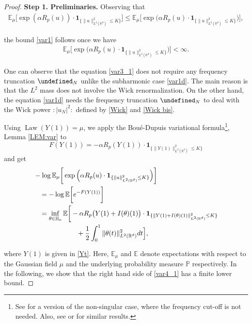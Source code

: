 \documentclass[%
11pt,  reqno]{amsart}
\theoremstyle{remarkstyle}
\newcommand{\1}{\hspace{0.2mm}\text{I}\hspace{0.2mm}}
\newcommand{\noi}{\noindent}
\newcommand{\R}{\mathbb{R}}
\let\P= \undefined
\newcommand{\P}{\mathbf{P}}
\newcommand{\E}{\mathbb{E}}
\newcommand{\al}{\alpha}
\newcommand{\ind}{\mathbf 1}
\newcommand{\PP}{\mathbb{P}}
\DeclareMathOperator{\Law}{Law}
\numberwithin{equation}{section}
\numberwithin{theorem}{section}
\begin{document}
	
	\begin{proof}
		
		\noindent\textbf{Step 1. Preliminaries.} Observing that
		\begin{align*}
			\E_{\mu}  \Big[ \exp (\al R_p(u)) \cdot  \ind_{\{\|u\|^2_{L^2(\R^d)}\le K\}}\Big]
			\le \E_{\mu}  \bigg[ \exp \Big(\al R_p(u) \cdot  \ind_{\{\|u\|^2_{L^2(\R^d)}\le K\}} \Big)\bigg],
		\end{align*}
		
		\noi
		the bound \eqref{var1} follows once we have
		\begin{align}\label{var3_1}
			\E_{\mu}  \bigg[ \exp \Big(\al R_p(u) \cdot  \ind_{\{\|u\|^2_{L^2(\R^d)}\le K\}} \Big)\bigg]  < \infty.
		\end{align}
		
		\medskip 
		One can observe that the equation \eqref{var3_1} does not require any frequency truncation $\P_N$ unlike the subharmonic case \eqref{var1d}. The main reason is that the $L^2$ mass does not involve the Wick renormalization. On the other hand, the equation \eqref{var1d} needs the frequency truncation $\P_N$ to deal with the Wick power $:|u_N|^2:$ defined by \eqref{Wick} and \eqref{Wick bis}.
		
		Using $\Law(Y(1))= \mu$, we apply the Bou\'e-Dupuis variational formula\footnote{See \cite[Theorem 3.2]{Zhang09} for a version of the non-singular case, where the frequency cut-off is not needed. Also, see \cite[Proposition A.1]{TW23} or \cite[Lemma 3.1]{LW22} for similar results.}, Lemma \ref{LEM:var} to 
		$$
		F(Y(1)) = - \al R_p(Y(1)) \cdot  \ind_{\{\|Y(1)\|^2_{L^2(\R^d)}\le K\}}
		$$ 
		and get
		\begin{align}
			\label{var4_1}
			\begin{split}
				&- \log \E_\mu \bigg[ \exp \Big(\al R_p(u) \cdot  \ind_{\{\|u\|^2_{L^2(\R^d)}\le K\}} \Big)\bigg] \\
				&\hphantom{X} = - \log \E \bigg[ e^{-F(Y(1))}\bigg]\\
				&\hphantom{X} = \inf_{\theta \in \mathbb{H}_a} \E \bigg[ -\al R_p\big(Y(1) + I(\theta)(1)\big)\cdot \ind_{\{\|Y(1)+I(\theta)(1)\|^2_{L^2(\R^d)}\le K\}} \\
				& \hphantom{XXXXXXX} + \frac12 \int_0^1 
				\| \theta (t) \|_{L^2(\R^d)}^2 dt  \Big],
			\end{split}
		\end{align}
		
		\noi
		where $Y(1)$ is given in \eqref{Yt}.
		Here, $\E_{\mu}$ and $\E$ denote expectations with respect to the Gaussian field $\mu$ and the underlying probability measure $\PP$ respectively.
		In the following, 
		we show that the right hand side of \eqref{var4_1} 
		has a finite lower bound.
		

\end{proof}
\end{document}
